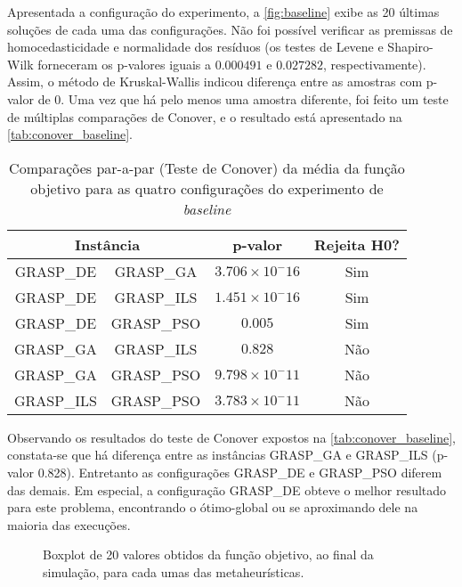 Apresentada a configuração do experimento, a \autoref{fig:baseline} exibe as 20 últimas soluções de cada uma das configurações. Não foi possível verificar as premissas de homocedasticidade e normalidade dos resíduos (os testes de Levene e Shapiro-Wilk forneceram os p-valores iguais a $0.000491$ e $0.027282$, respectivamente). Assim, o método de Kruskal-Wallis indicou diferença entre as amostras com p-valor de $0$. Uma vez que há pelo menos uma amostra diferente, foi feito um teste de múltiplas comparações de Conover, e o resultado está apresentado na \autoref{tab:conover_baseline}.

\begin{table}
    \caption{Comparações par-a-par (Teste de Conover) da média da função objetivo para as quatro configurações do experimento de \textit{baseline} }
	\centering
    \begin{tabular}{cccc}
        \toprule
        \multicolumn{2}{c}{\textbf{Instância}}        &    \textbf{p-valor}       &   \textbf{Rejeita H0?}\\
        \midrule
        GRASP\_DE   &	GRASP\_GA	&	$3.706 \times 10^-16$   &   Sim \\
        GRASP\_DE	&	GRASP\_ILS	&   $1.451 \times 10^-16$   &   Sim \\
        GRASP\_DE	&	GRASP\_PSO  &   $0.005$                 &   Sim \\
        GRASP\_GA	&	GRASP\_ILS  &   $0.828$                 &   Não \\
        GRASP\_GA 	& 	GRASP\_PSO  &   $9.798 \times 10^-11$   &   Não \\
        GRASP\_ILS	&	GRASP\_PSO  &   $3.783 \times 10^-11$   &   Não \\
        \bottomrule
    \end{tabular}
    \label{tab:conover_baseline}
\end{table}

Observando os resultados do teste de Conover expostos na \autoref{tab:conover_baseline}, constata-se que há diferença entre as instâncias GRASP\_GA e GRASP\_ILS (p-valor 0.828). Entretanto as configurações GRASP\_DE e GRASP\_PSO diferem das demais. Em especial, a configuração GRASP\_DE obteve o melhor resultado para este problema, encontrando o ótimo-global ou se aproximando dele na maioria das execuções.

\begin{figure}[ht!]
\centering
\caption{Boxplot de 20 valores obtidos da  função objetivo, ao final da simulação, para cada umas das metaheurísticas.}

\label{fig:baseline}
\end{figure}

